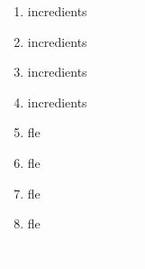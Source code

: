 \documentclass[a4paper]{article}
\begin{document}
\lisible
\vspace{16pt}
\begin{multicols}{2}
\begin{enumerate}[font={\Large\color{Blue!50!black}\nums}]
\item incredients
\item incredients
\item incredients
\item incredients
\item   fle
\item   fle
\item   fle
\item   fle
\end{enumerate}
\end{multicols}
\vspace{11pt}
\noindent \textcolor{white}{ preparation
preparation
}

\vspace{10pt}
\newpage
\end{document}
